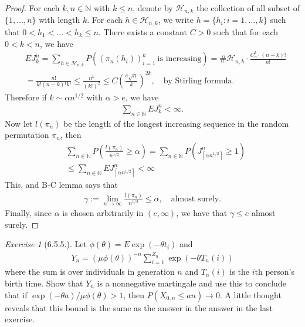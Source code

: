 \documentclass[12pt,a4paper]{amsart}
\theoremstyle{plain}
\theoremstyle{definition}
\theoremstyle{remark}
\newtheorem*{exe}{Exercise}
\numberwithin{equation}{section}
\begin{document}
\begin{proof}
For each $k,n \in \mathbb N$ with $k\leq n$, denote by $\mathcal H_{n,k}$ the collection of all subset of $\{1,\dots, n\}$ with length $k$. For each $h \in \mathcal H_{n,k}$, we write $h = \{h_i: i=1,\dots, k\}$ such that $0< h_1< \dots < h_k\leq n$. 
There exists a constant $C>0$ such that for each $0<k< n$, we have
\begin{align}
&E J_k^n 
= \sum_{h \in \mathcal H_{n,k}} P\left( \left(\pi_n(h_i)\right)_{i=1}^k~\text{is increasing} \right)
= \# \mathcal H_{n,k} \cdot \frac{ C_n^k \cdot (n-k)!}{n!}
\\&= \frac{n!}{k!(n-k)!k!}
\leq \frac{n^k}{(k!)^2}
 \leq C \left(\frac{e\sqrt n}{ k } \right )^{2k},
\quad \text{by Stirling formula}. 
\end{align}
Therefore if $k \sim \alpha n^{1/2}$ with $\alpha > e$, we have
\begin{align}
 \sum_{n\in \mathbb N}E J_k^n < \infty.
\end{align}
Now let $l(\pi_n)$ be the length of the longest increasing sequence in the random permutation $\pi_n$, then
\begin{align}
  & \sum_{n\in \mathbb N} P\left( \frac{l(\pi_n)}{n^{1/2}} \geq  \alpha \right)
  =\sum_{n\in \mathbb N} P\left( J_{\left\lceil \alpha n^{1/2}\right\rceil}^n \geq 1\right)
  \\& \leq \sum_{n\in \mathbb N} E J_{\left\lceil \alpha n^{1/2}\right\rceil}^n
  < \infty 
\end{align}
This, and B-C lemma says that
\begin{align}
\gamma 
:= \lim_{n\to \infty} \frac{l(\pi_n)}{n^{1/2}}
\leq \alpha,
\quad \text{almost surely}.
\end{align}
Finally, since $\alpha$ is chosen arbitrarily in $(e,\infty)$, we have that $\gamma \leq e$ almost surely.
\end{proof}
\begin{exe}[6.5.5.]
Let $\phi(\theta) = E \exp(-\theta t_i)$ and
\begin{align}
Y_n =\left( \mu \phi(\theta) \right)^{-n} \sum_{i=1}^{Z_n} \exp\left( -\theta T_n(i) \right)
\end{align}
where the sum is over individuals in generation $n$ and $T_n(i)$ is the $i$th person's birth time.
Show that $Y_n$ is a nonnegative martingale and use this to conclude that if $\exp(-\theta a)/\mu \phi(\theta) > 1$, then $P(X_{0,n}\leq an)\to 0$. 
A little thought reveals that this bound is the same as the answer in the answer in the last exercise.
\end{exe}
\end{document}
